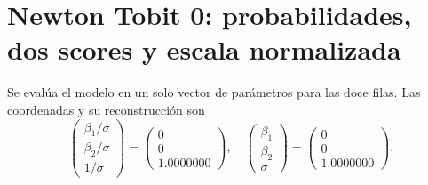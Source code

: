 \documentclass[11pt,a4paper]{article}
\begin{document}
\clearpage
\section{Newton Tobit 0: probabilidades, dos scores y escala normalizada}\label{unidad106}
Se evalúa el modelo en un solo vector
de parámetros para las doce filas.
Las coordenadas y su reconstrucción son
\[
\begin{pmatrix}\beta_1/\sigma\\\beta_2/\sigma\\1/\sigma\end{pmatrix}=\begin{pmatrix}0\\0\\1.0000000\end{pmatrix},\quad\begin{pmatrix}\beta_1\\\beta_2\\\sigma\end{pmatrix}=\begin{pmatrix}0\\0\\1.0000000\end{pmatrix}.
\]
\end{document}
